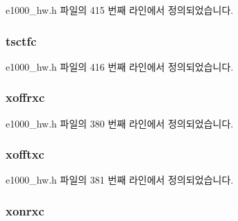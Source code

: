 e1000\+\_\+hw.\+h 파일의 415 번째 라인에서 정의되었습니다.

\subsubsection[{\texorpdfstring{tsctfc}{tsctfc}}]{ tsctfc}\hypertarget{structe1000__hw__stats_a755889eab838ce46285dbd064c97e4b4}{}\label{structe1000__hw__stats_a755889eab838ce46285dbd064c97e4b4}


e1000\+\_\+hw.\+h 파일의 416 번째 라인에서 정의되었습니다.

\subsubsection[{\texorpdfstring{xoffrxc}{xoffrxc}}]{ xoffrxc}\hypertarget{structe1000__hw__stats_ac515a044e95d32be8df03b4a3c9da4ac}{}\label{structe1000__hw__stats_ac515a044e95d32be8df03b4a3c9da4ac}


e1000\+\_\+hw.\+h 파일의 380 번째 라인에서 정의되었습니다.

\subsubsection[{\texorpdfstring{xofftxc}{xofftxc}}]{ xofftxc}\hypertarget{structe1000__hw__stats_aae14a6e5f5330207e220a147a5202c17}{}\label{structe1000__hw__stats_aae14a6e5f5330207e220a147a5202c17}


e1000\+\_\+hw.\+h 파일의 381 번째 라인에서 정의되었습니다.

\subsubsection[{\texorpdfstring{xonrxc}{xonrxc}}]{ xonrxc}\hypertarget{structe1000__hw__stats_aeb7389891cfecff89e77880c8e7dbdb5}{}\label{structe1000__hw__stats_aeb7389891cfecff89e77880c8e7dbdb5}


